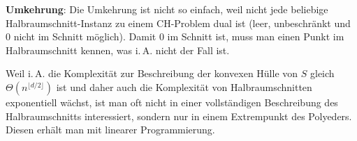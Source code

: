 \textbf{Umkehrung}:
Die Umkehrung ist nicht so einfach, weil nicht jede beliebige Halbraumschnitt-Instanz zu einem
CH-Problem dual ist (leer, unbeschränkt und $0$ nicht im Schnitt möglich).
Damit $0$ im Schnitt ist, muss man einen Punkt im Halbraumschnitt kennen, was i.\,A.
nicht der Fall ist.

Weil i.\,A. die Komplexität zur Beschreibung der konvexen Hülle von $S$ gleich
$\Theta(n^{\lfloor d/2 \rfloor})$ ist und daher auch die Komplexität von Halbraumschnitten
exponentiell wächst, ist man oft nicht in einer vollständigen Beschreibung des Halbraumschnitts
interessiert, sondern nur in einem Extrempunkt des Polyeders.
Diesen erhält man mit linearer Programmierung.

\pagebreak

